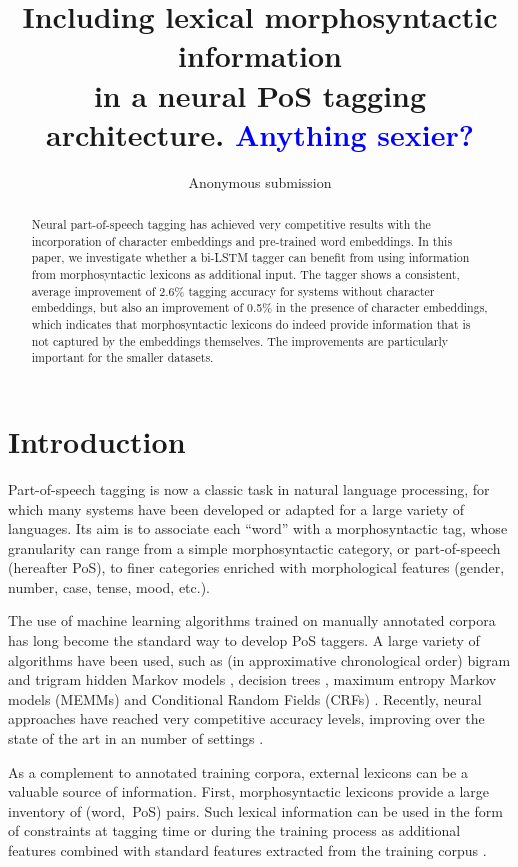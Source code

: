 \documentclass[11pt,letterpaper]{article}
\title{Including lexical morphosyntactic information\\in a neural PoS tagging architecture. \textcolor{blue}{Anything sexier?}}
\author{Anonymous submission}
\date{}
\begin{document}
\maketitle

\begin{abstract}
  Neural part-of-speech tagging has achieved very competitive results with the incorporation of character embeddings and pre-trained word embeddings. In this paper, we investigate whether a bi-LSTM tagger can benefit from using information from morphosyntactic lexicons as additional input. The tagger shows a consistent, average improvement of 2.6\% tagging accuracy for systems without character embeddings, but also an improvement of 0.5\% in the presence of character embeddings, which indicates that morphosyntactic lexicons do indeed provide information that is not captured by the embeddings themselves. The improvements are particularly important for the smaller datasets.
\end{abstract}


\section{Introduction}

Part-of-speech tagging is now a classic task in natural language processing, for which many systems have been developed
or adapted for a large variety of languages. Its aim is to associate each ``word'' with a morphosyntactic tag, whose
granularity can range from a simple morphosyntactic category, or part-of-speech (hereafter PoS), to finer categories
enriched with morphological features (gender, number, case, tense, mood, etc.).

The use of machine learning algorithms trained on manually annotated corpora has long become the standard way to develop
PoS taggers. A large variety of algorithms have been used, such as (in approximative chronological order) bigram and
trigram hidden Markov models \cite{merialdo94,brants96,brants00}, decision trees \cite{schmid94,magerman95}, maximum
entropy Markov models (MEMMs) \cite{ratnaparkhi96} and Conditional Random Fields (CRFs)
\cite{lafferty01,constant12}. Recently, neural approaches have reached very competitive accuracy levels, improving over
the state of the art in an number of settings \cite{plank16}.

As a complement to  annotated training corpora, external lexicons can be a valuable source of information.
First, morphosyntactic lexicons provide a large inventory of (word,~PoS)
pairs. Such lexical information can be used in the form of constraints at tagging time \cite{kim99,hajic00tagging} or
during the training process as additional features combined with standard features extracted from the training corpus
\cite{chrupala08,goldberg09,denis12}.
\end{document}
